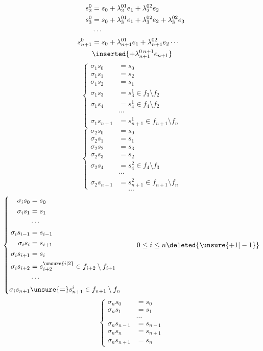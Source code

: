 \[
\begin{aligned}
s_2^0&=s_0+\lambda_2^{01}e_1+\lambda_2^{02}e_2\\
s_3^0&=s_0+\lambda_3^{01}e_1+\lambda_3^{02}e_2+\lambda_3^{02}e_3\\
&\cdots\\
s_{n+1}^0&=s_0+\lambda_{n+1}^{01}e_1+\lambda_{n+1}^{02}e_2\cdots\\
&\inserted{+\lambda_{n+1}^{0\,n+1}e_{n+1}}
\end{aligned}
\]
\[
\left\{\begin{aligned}
\sigma_1s_0&=s_0\\
\sigma_1s_1&=s_2\\
\sigma_1s_2&=s_1\\
\sigma_1s_3&=s_3^1\in f_3\setminus f_2\\
\sigma_1s_4&=s_4^1\in f_4\setminus f_2\\
&\cdots\\
\sigma_1s_{n+1}&=s_{n+1}^1\in f_{n+1}\setminus f_n
\end{aligned}\right.
\]
\[
\left\{\begin{aligned}
\sigma_2s_0&=s_0\\
\sigma_2s_1&=s_1\\
\sigma_2s_2&=s_3\\
\sigma_2s_3&=s_2\\
\sigma_2s_4&=s_4^2\in f_4\setminus f_3\\
&\cdots\\
\sigma_2s_{n+1}&=s_{n+1}^2\in f_{n+1}\setminus f_n
\end{aligned}\right.
\]
\[
\cdots
\]
\[
\left\{\begin{aligned}
\sigma_i s_0&=s_0\\
\sigma_i s_1&=s_1\\
&\cdots\\
\sigma_i s_{i-1}&=s_{i-1}\\
\sigma_i s_i&=s_{i+1}\\
\sigma_i s_{i+1}&=s_i\\
\sigma_i s_{i+2}&=s_{i+2}^{\unsure{i|2}}\in f_{i+2}\setminus f_{i+1}\\
&\cdots\\
\sigma_i s_{n+1}&\unsure{=}s_{n+1}^i\in f_{n+1}\setminus f_n
\end{aligned}\right.\qquad0\leq i\leq n\deleted{\unsure{+1|-1}}
\]
\[
\left\{\begin{aligned}
\sigma_ns_0&=s_0\\
\sigma_ns_1&=s_1\\
&\cdots\\
\sigma_ns_{n-1}&=s_{n-1}\\
\sigma_ns_n&=s_{n+1}\\
\sigma_ns_{n+1}&=s_n
\end{aligned}\right.
\]
